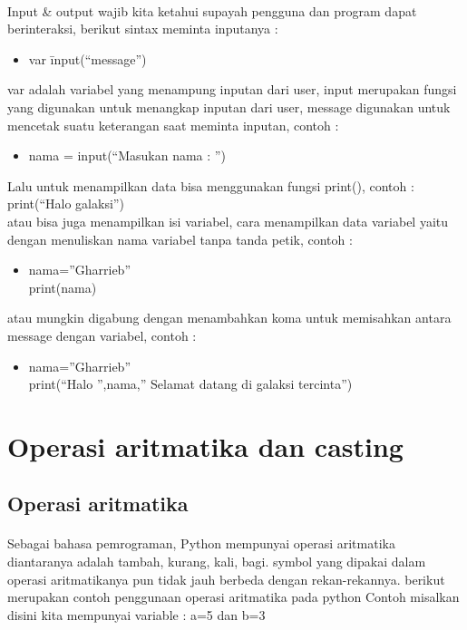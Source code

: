 \documentclass[a4paper,12pt]{report}
\begin{document}
\paragraph{}
Input \& output wajib kita ketahui supayah pengguna dan program dapat berinteraksi, berikut sintax meminta inputanya :\\
\begin{itemize}
	\item var \= input(“message”)\\
\end{itemize}
var adalah variabel yang menampung inputan dari user, input merupakan fungsi yang digunakan untuk menangkap inputan dari user, message digunakan untuk mencetak suatu keterangan saat meminta inputan, contoh :\\
\begin{itemize}
	\item nama = input(“Masukan nama : ”)\\
\end{itemize}
Lalu untuk menampilkan data bisa menggunakan fungsi print(), contoh :\\
print(“Halo galaksi”)\\
atau bisa juga menampilkan isi variabel, cara menampilkan data variabel yaitu dengan menuliskan nama variabel tanpa tanda petik, contoh :\\
\begin{itemize}
	\item nama=”Gharrieb”\\
print(nama)\\
\end{itemize}
atau mungkin digabung dengan menambahkan koma untuk memisahkan antara message dengan variabel, contoh :\\
\begin{itemize}
	\item nama=”Gharrieb”\\
print(“Halo ”,nama,” Selamat datang di galaksi tercinta”)\\
\end{itemize}
\section{Operasi aritmatika dan casting}
\subsection{Operasi aritmatika}
\paragraph{}
Sebagai bahasa pemrograman, Python mempunyai operasi aritmatika diantaranya adalah tambah, kurang, kali, bagi.  symbol yang dipakai dalam operasi aritmatikanya pun tidak jauh berbeda dengan rekan-rekannya.  berikut merupakan contoh penggunaan operasi aritmatika pada python
Contoh misalkan disini kita mempunyai variable : a=5 dan b=3\\
\end{document}
